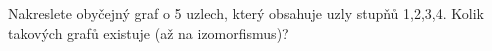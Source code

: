 Nakreslete obyčejný graf o 5 uzlech, který obsahuje uzly stupňů 1,2,3,4. Kolik
takových grafů existuje (až na izomorfismus)?
